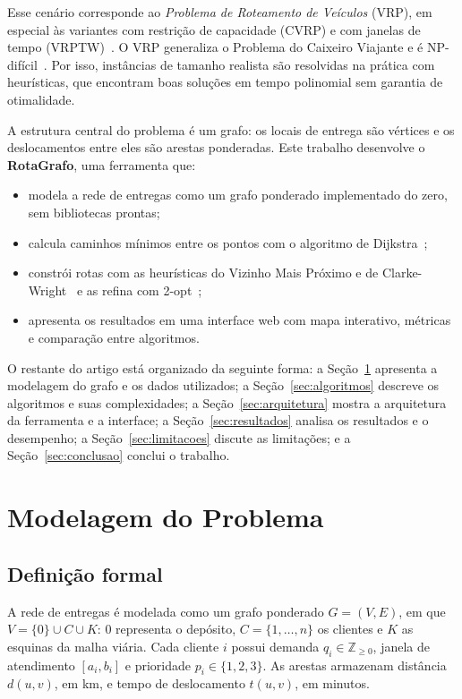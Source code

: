\documentclass[12pt]{article}
\begin{document}
Esse cenário corresponde ao \textit{Problema de Roteamento de Veículos} (VRP), em
especial às variantes com restrição de capacidade (CVRP) e com janelas de tempo
(VRPTW)~\cite{toth2014vehicle,solomon1987algorithms}. O VRP generaliza o Problema do
Caixeiro Viajante e é NP-difícil~\cite{neovrp}. Por isso, instâncias de tamanho realista são
resolvidas na prática com heurísticas, que encontram boas soluções em tempo
polinomial sem garantia de otimalidade.

A estrutura central do problema é um grafo: os locais de entrega são vértices e os
deslocamentos entre eles são arestas ponderadas. Este trabalho desenvolve o
\textbf{RotaGrafo}, uma ferramenta que:
\begin{itemize}
  \item modela a rede de entregas como um grafo ponderado implementado do zero, sem
        bibliotecas prontas;
  \item calcula caminhos mínimos entre os pontos com o algoritmo de
        Dijkstra~\cite{dijkstra1959note};
  \item constrói rotas com as heurísticas do Vizinho Mais Próximo e de
        Clarke-Wright~\cite{clarke1964scheduling} e as refina com
        2-opt~\cite{croes1958method};
  \item apresenta os resultados em uma interface web com mapa interativo, métricas e
        comparação entre algoritmos.
\end{itemize}

O restante do artigo está organizado da seguinte forma: a
Seção~\ref{sec:modelagem} apresenta a modelagem do grafo e os dados utilizados; a
Seção~\ref{sec:algoritmos} descreve os algoritmos e suas complexidades; a
Seção~\ref{sec:arquitetura} mostra a arquitetura da ferramenta e a interface; a
Seção~\ref{sec:resultados} analisa os resultados e o desempenho; a
Seção~\ref{sec:limitacoes} discute as limitações; e a
Seção~\ref{sec:conclusao} conclui o trabalho.

\section{Modelagem do Problema}\label{sec:modelagem}

\subsection{Definição formal}

A rede de entregas é modelada como um grafo ponderado $G = (V, E)$, em que
$V = \{0\} \cup C \cup K$: $0$ representa o depósito, $C = \{1, \dots, n\}$ os clientes
e $K$ as esquinas da malha viária. Cada cliente $i$ possui demanda
$q_i \in \mathbb{Z}_{\geq 0}$, janela de atendimento $[a_i, b_i]$ e prioridade
$p_i \in \{1, 2, 3\}$. As arestas armazenam distância $d(u, v)$, em km, e tempo de
deslocamento $t(u, v)$, em minutos.
\end{document}
